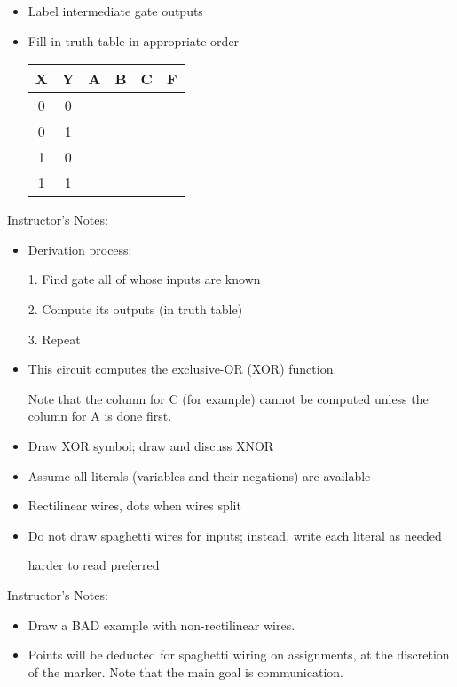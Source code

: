 
\begin{frame}[fragile]
\begin{itemize}
	\item Label intermediate gate outputs
	\item Fill in truth table in appropriate order

	\bigskip\bigskip
	\begin{center}
	\begin{tabular}{cc|ccc|c}
		X & Y & A & B & C & F\\
		\hline
		0 & 0 &&&&\\
		0 & 1 &&&&\\
		1 & 0 &&&&\\
		1 & 1 &&&&
	\end{tabular}
	\end{center}
\end{itemize}
\end{frame}
\BNotes\ifnum{}
\begin{frame}[fragile]
Instructor's Notes:
\begin{itemize}
\item Derivation process:

	1. Find gate all of whose inputs are known

	2. Compute its outputs (in truth table)

	3. Repeat
\item This circuit computes the exclusive-OR (XOR) function. 

	Note that the column for C (for example)
	cannot be computed unless the column for A is done first.
\item Draw XOR symbol; draw and discuss XNOR
\end{itemize}
\end{frame}
\fi\ENotes

\begin{frame}[fragile]
\begin{itemize}
	\item Assume all literals (variables and their negations) are available
	\item Rectilinear wires, dots when wires split
	\item Do not draw spaghetti wires for inputs; instead, write
	each literal as needed


	\centerline{\hfill harder to read \hfill preferred \hfill}

\end{itemize}
\BNotes\ifnum{}
Instructor's Notes:
\begin{itemize}
\item Draw a BAD example with non-rectilinear wires.
\item Points will be deducted for spaghetti wiring on assignments, at the
discretion of the marker. Note that the main goal is communication.
\end{itemize}
\fi\ENotes
\end{frame}

